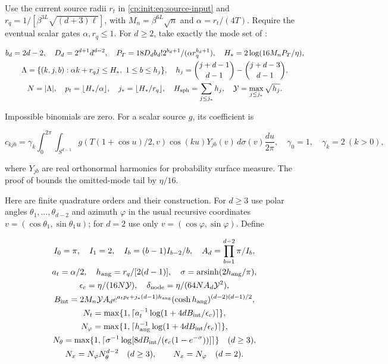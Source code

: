 Use the current source radii $r_t$ in
\eqref{cp:init:eq:source-input} and
$r_q=1/[\beta^{3L}\sqrt{(d+3)\ell}]$, with
$M_n=\beta^{6L}\sqrt n$ and $\alpha=r_t/(4T)$.
Require the eventual scalar gates $\alpha,r_q\le1$.
For $d\ge2$, take exactly the mode set of
:

\begin{equation}
\label{cp:init:eq:harmonic-modes}
\begin{gathered}
b_d=2d-2,\quad D_d=2^{d+1}d^{d-2},\quad
P_T=18D_db_d!2^{b_d+1}/(\alpha r_q^{b_d+1}),\quad
H_*=2\log(16M_nP_T/\eta),\\
\Lambda=\{(k,j,b):\alpha k+r_qj\le H_*,\ 1\le b\le h_j\},\quad
h_j={j+d-1\choose d-1}-{j+d-3\choose d-1},\\
N=|\Lambda|,\quad p_t=\lfloor H_*/\alpha\rfloor,\quad
j_*=\lfloor H_*/r_q\rfloor,\quad
H_{\rm sph}=\sum_{j\le j_*}h_j,\quad\mathcal Y=\max_{j\le j_*}\sqrt{h_j}.
\end{gathered}
\end{equation}

Impossible binomials are zero. For a scalar source $g$, its coefficient
is

\begin{equation}
\label{cp:init:eq:harmonic-coefficient}
c_{kjb}=\gamma_k\int_0^{2\pi}\!\int_{S^{d-1}}
g(T(1+\cos u)/2,v)\cos(ku)Y_{jb}(v)\,d\sigma(v)\frac{du}{2\pi},
\quad\gamma_0=1,\quad\gamma_k=2\ (k>0),
\end{equation}

where $Y_{jb}$ are real orthonormal harmonics for probability surface
measure. The proof of  bounds
the omitted-mode tail by $\eta/16$.

Here are finite quadrature orders and their construction. For $d\ge3$
use polar angles $\theta_1,\ldots,\theta_{d-2}$ and azimuth
$\varphi$ in the usual recursive coordinates
$v=(\cos\theta_1,\sin\theta_1u)$; for $d=2$ use only
$v=(\cos\varphi,\sin\varphi)$. Define

\begin{equation}
\label{cp:init:eq:quadrature-orders}
\begin{gathered}
I_0=\pi,\quad I_1=2,\quad I_b=(b-1)I_{b-2}/b,\quad
A_d=\prod_{b=1}^{d-2}\pi/I_b,\\
a_t=\alpha/2,\quad h_{\rm ang}=r_q/[2(d-1)],\quad
\sigma=\operatorname{arsinh}(2h_{\rm ang}/\pi),\\
\epsilon_c=\eta/(16N\mathcal Y),\quad
\delta_{\rm node}=\eta/(64NA_d\mathcal Y^2),\\
B_{\rm int}=2M_n\mathcal YA_d
 e^{a_tp_t+j_*(d-1)h_{\rm ang}}
                 (\cosh h_{\rm ang})^{(d-2)(d-1)/2},\\
N_t=\max\{1,\lceil a_t^{-1}\log(1+4dB_{\rm int}/\epsilon_c)\rceil\},\\
N_\varphi=\max\{1,\lceil h_{\rm ang}^{-1}\log(1+4dB_{\rm int}/\epsilon_c)\rceil\},\\
N_\theta=\max\{1,\lceil\sigma^{-1}
 \log[8dB_{\rm int}/(\epsilon_c(1-e^{-\sigma}))]\rceil\}\quad(d\ge3),\\
N_x=N_\varphi N_\theta^{d-2}\quad(d\ge3),\qquad N_x=N_\varphi\quad(d=2).
\end{gathered}
\end{equation}

